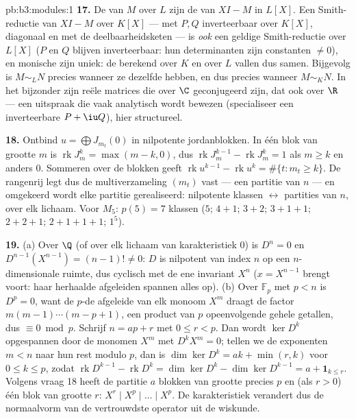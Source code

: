 \begin{solution}{pb:b3:modules:1}
\textbf{17.} De  van $M$ over $L$ zijn
de  van $XI - M$ in $L[X]$. Een Smith-reductie
van $XI - M$ over $K[X]$ --- met $P, Q$ inverteerbaar over $K[X]$,
diagonaal en met de deelbaarheidsketen --- is \emph{ook} een
geldige Smith-reductie over $L[X]$ ($P$ en $Q$ blijven
inverteerbaar: hun determinanten zijn constanten $\neq 0$), en
monische  zijn uniek: de 
berekend over $K$ en over $L$ vallen dus samen. Bijgevolg is $M
\sim_L N$ precies wanneer ze dezelfde  hebben,
en dus precies wanneer $M \sim_K N$. In het bijzonder zijn reële
matrices die over $\C$ geconjugeerd zijn, dat ook over $\R$ ---
een uitspraak die vaak analytisch wordt bewezen (specialiseer een
inverteerbare $P + \iu Q$), hier structureel.

\textbf{18.} Ontbind $u = \bigoplus J_{m_t}(0)$ in nilpotente
jordanblokken. In één blok van grootte $m$ is
$\operatorname{rk}J_m^k = \max(m - k, 0)$, dus
$\operatorname{rk}J_m^{k-1} - \operatorname{rk}J_m^k = 1$ als $m
\geq k$ en anders $0$. Sommeren over de blokken geeft
$\operatorname{rk}u^{k-1} - \operatorname{rk}u^k = \#\{t : m_t
\geq k\}$. De rangenrij legt dus de multiverzameling $(m_t)$ vast
--- een partitie van $n$ --- en omgekeerd wordt elke partitie
gerealiseerd: nilpotente klassen $\leftrightarrow$ partities van
$n$, over elk lichaam. Voor $M_5$: $p(5) = 7$ klassen ($5$;
$4{+}1$; $3{+}2$; $3{+}1{+}1$; $2{+}2{+}1$; $2{+}1{+}1{+}1$;
$1^5$).

\textbf{19.} (a) Over $\Q$ (of over elk lichaam van
karakteristiek $0$) is $D^n = 0$ en $D^{n-1}(X^{n-1}) = (n-1)!
\neq 0$: $D$ is nilpotent van index $n$ op een $n$-dimensionale
ruimte, dus cyclisch met de ene invariant $X^n$ ($x = X^{n-1}$
brengt voort: haar herhaalde afgeleiden spannen alles op). (b)
Over $\mathbb F_p$ met $p < n$ is $D^p = 0$, want de $p$-de
afgeleide van elk monoom $X^m$ draagt de factor $m(m-1)\cdots(m-p
+1)$, een product van $p$ opeenvolgende gehele getallen, dus
$\equiv 0 \bmod p$. Schrijf $n = ap + r$ met $0 \leq r < p$. Dan
wordt $\ker D^k$ opgespannen door de monomen $X^m$ met $D^kX^m =
0$; tellen we de exponenten $m < n$ naar hun rest modulo $p$, dan
is $\dim\ker D^k = ak + \min(r, k)$ voor $0 \leq k \leq p$, zodat
$\operatorname{rk}D^{k-1} - \operatorname{rk}D^k = \dim\ker D^k -
\dim\ker D^{k-1} = a + \mathbf 1_{k \leq r}$. Volgens vraag 18
heeft de partitie $a$ blokken van grootte precies $p$ en (als $r >
0$) één blok van grootte $r$:  $X^r
\mid X^p \mid \dots \mid X^p$. De karakteristiek verandert dus de
normaalvorm van de vertrouwdste operator uit de wiskunde.


\end{solution}
